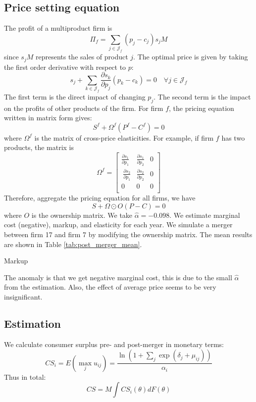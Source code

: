\documentclass[12pt]{article}[margin=1in]
\begin{document}
\subsection{Price setting equation}
The profit of a multiproduct firm is
\begin{equation*}
    \Pi_f = \sum_{j\in \mathcal{J}_f} (p_j - c_j) s_j M
\end{equation*}
since $s_j M$ represents the sales of product $j$. The optimal price is given by taking the first order derivative with respect to $p$:
\begin{equation*}
    s_j + \sum_{k\in \mathcal{J}_f} \frac{\partial s_k}{\partial p_j} (p_k - c_k) = 0 \quad \forall j \in \mathcal{J}_f
\end{equation*}
The first term is the direct impact of changing $p_j$. The second term is the
impact on the profits of other products of the firm.
For firm $f$, the pricing equation written in matrix form gives:
\begin{equation*}
    S^f + \Omega^f (P^f - C^f) = 0
\end{equation*}
where $\Omega^f$ is the matrix of cross-price elasticities.
For example, if firm $f$ has two products, the matrix is $$
    \Omega^f =\begin{bmatrix}
        \frac{\partial s_1}{\partial p_1} & \frac{\partial s_1}{\partial p_2} & 0 \\\ \frac{\partial s_2}{\partial p_1} &\frac{\partial s_2}{\partial p_2} & 0 \\0 & 0 &0\\
    \end{bmatrix}$$
Therefore, aggregate the pricing equation for all firms, we have $$ S + \Omega
    \odot O (P-C) = 0 $$ where $O$ is the ownership matrix.
We take $\hat{\alpha} = -0.098$. We estimate marginal cost (negative), markup,
and elasticity for each year. We simulate a merger between firm 17 and firm 7
by modifying the ownership matrix. The mean results are shown in Table
\ref{tab:post_merger_mean}.

\begin{table}[h!]
    \fontsize{10pt}{12pt}\selectfont
    \centering
    
    \caption{Markup}
    \label{tab:post_merger_mean}
\end{table}
The anomaly is that we get
negative marginal cost, this is due to the small $\hat{\alpha}$ from the
estimation. Also, the effect of average price seems to be very insignificant.

\subsection{Estimation}
We calculate consumer surplus pre- and post-merger in monetary terms:
\begin{equation*}
    CS_i = E(\max_j u_{ij}) = \frac{\ln(1 + \sum_j \exp(\delta_j + \mu_{ij}))}{\alpha_i}
\end{equation*}
Thus in total:
\begin{equation*}
    CS = M \int CS_i(\theta) dF(\theta)
\end{equation*}
\end{document}
